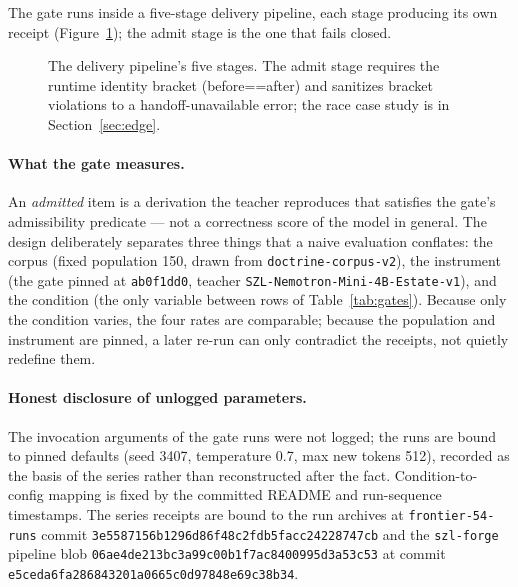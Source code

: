 The gate runs inside a five-stage delivery pipeline, each stage producing its own receipt (Figure~\ref{fig:deploypipe}); the admit stage is the one that fails closed.

\begin{figure}[htbp]
\centering
{}
\caption{The delivery pipeline's five stages. The admit stage requires the runtime identity bracket (before==after) and sanitizes bracket violations to a handoff-unavailable error; the race case study is in Section~\ref{sec:edge}.}
\label{fig:deploypipe}
\end{figure}

\paragraph{What the gate measures.} An \emph{admitted} item is a derivation the teacher reproduces that satisfies the gate's admissibility predicate --- not a correctness score of the model in general. The design deliberately separates three things that a naive evaluation conflates: the corpus (fixed population 150, drawn from \texttt{doctrine-corpus-v2}), the instrument (the gate pinned at \texttt{ab0f1dd0}, teacher \texttt{SZL-Nemotron-Mini-4B-Estate-v1}), and the condition (the only variable between rows of Table~\ref{tab:gates}). Because only the condition varies, the four rates are comparable; because the population and instrument are pinned, a later re-run can only contradict the receipts, not quietly redefine them.

\paragraph{Honest disclosure of unlogged parameters.} The invocation arguments of the gate runs were not logged; the runs are bound to pinned defaults (seed 3407, temperature 0.7, max new tokens 512), recorded as the basis of the series rather than reconstructed after the fact. Condition-to-config mapping is fixed by the committed README and run-sequence timestamps. The series receipts are bound to the run archives at \texttt{frontier-54-runs} commit \texttt{3e5587156b1296d86f48c2fdb5facc24228747cb} and the \texttt{szl-forge} pipeline blob \texttt{06ae4de213bc3a99c00b1f7ac8400995d3a53c53} at commit \texttt{e5ceda6fa286843201a0665c0d97848e69c38b34}.

